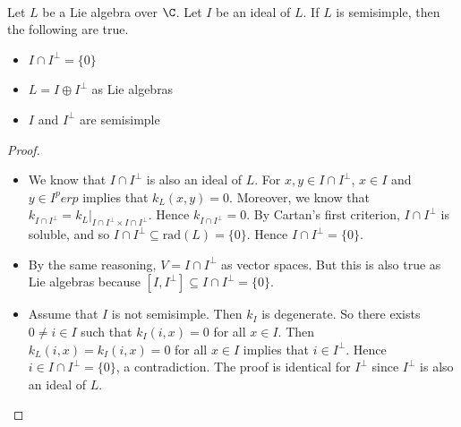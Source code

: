 \documentclass[a4paper]{article}
\begin{document}
\begin{lmm}{}{} \\Let $L$ be a Lie algebra over $\C$. Let $I$ be an ideal of $L$. If $L$ is semisimple, then the following are true. 
\begin{itemize}
\item $I\cap I^\perp=\{0\}$
\item $L=I\oplus I^\perp$ as Lie algebras
\item $I$ and $I^\perp$ are semisimple
\end{itemize} 
\begin{proof}~\\
\begin{itemize}
\item We know that $I\cap I^\perp$ is also an ideal of $L$. For $x,y\in I\cap I^\perp$, $x\in I$ and $y\in I^perp$ implies that $k_L(x,y)=0$. Moreover, we know that $k_{I\cap I^\perp}=k_L|_{I\cap I^\perp\times I\cap I^\perp}$. Hence $k_{I\cap I^\perp}=0$. By Cartan's first criterion, $I\cap I^\perp$ is soluble, and so $I\cap I^\perp\subseteq\text{rad}(L)=\{0\}$. Hence $I\cap I^\perp=\{0\}$. 
\item By the same reasoning, $V=I\cap I^\perp$ as vector spaces. But this is also true as Lie algebras because $[I,I^\perp]\subseteq I\cap I^\perp=\{0\}$. 
\item Assume that $I$ is not semisimple. Then $k_I$ is degenerate. So there exists $0\neq i\in I$ such that $k_I(i,x)=0$ for all $x\in I$. Then $k_L(i,x)=k_I(i,x)=0$ for all $x\in I$ implies that $i\in I^\perp$. Hence $i\in I\cap I^\perp=\{0\}$, a contradiction. The proof is identical for $I^\perp$ since $I^\perp$ is also an ideal of $L$. 
\end{itemize}
\end{proof}
\end{lmm}
\end{document}
